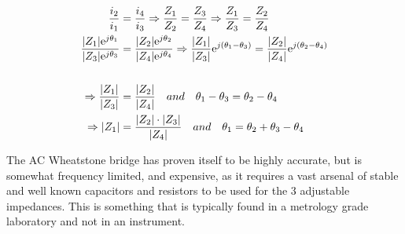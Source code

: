 \begin{equation}
    \begin{split}
        \label{eq:4_2_MatchedWheatstone}
        \frac{i_2}{i_1} &= \frac{i_4}{i_3} \Rightarrow \frac{Z_1}{Z_2} = \frac{Z_3}{Z_4} \Rightarrow \frac{Z_1}{Z_3} = \frac{Z_2}{Z_4} \\
        \frac{|Z_1|\mathrm{e}^{j\theta_1}}{|Z_3|\mathrm{e}^{j\theta_3}} &= \frac{|Z_2|\mathrm{e}^{j\theta_2}}{|Z_4|\mathrm{e}^{j\theta_4}}
        \Rightarrow \frac{|Z_1|}{|Z_3|}\mathrm{e}^{j\left(\theta_1-\theta_3\right)} = \frac{|Z_2|}{|Z_4|}\mathrm{e}^{j\left(\theta_2-\theta_4\right)} \\
        \\
        \Rightarrow \frac{|Z_1|}{|Z_3|} &= \frac{|Z_2|}{|Z_4|} \quad and \quad \theta_1-\theta_3 = \theta_2-\theta_4 \\
        \Rightarrow |Z_1| &= \frac{|Z_2|\cdot|Z_3|}{|Z_4|} \quad and \quad \theta_1 = \theta_2+\theta_3-\theta_4
    \end{split}
\end{equation}

The AC Wheatstone bridge has proven itself to be highly accurate, but is somewhat frequency limited, and expensive, as it requires a
vast arsenal of stable and well known capacitors and resistors to be used for the 3 adjustable impedances. This is something that
is typically found in a metrology grade laboratory and not in an instrument.
